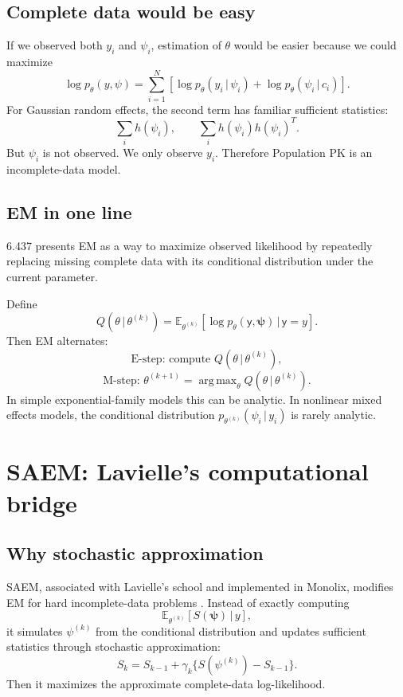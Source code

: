 \documentclass[a4paper]{article}
\DeclareMathOperator*{\argmax}{arg\,max}
\newcommand{\rv}[1]{\mathsf{#1}}
\newcommand{\rpsi}{\boldsymbol{\psi}}
\newcommand{\given}{\,|\,}
\newcommand{\E}{\mathbb{E}}
\begin{document}
\subsection{Complete data would be easy}

If we observed both \(y_i\) and \(\psi_i\), estimation of \(\theta\) would be easier because we could maximize
\[
  \log p_\theta(y,\psi)
  =
  \sum_{i=1}^N
  \left[
    \log p_\theta(y_i\given \psi_i)
    +
    \log p_\theta(\psi_i\given c_i)
  \right].
\]
For Gaussian random effects, the second term has familiar sufficient statistics:
\[
  \sum_i h(\psi_i), \qquad
  \sum_i h(\psi_i)h(\psi_i)^T.
\]
But \(\psi_i\) is not observed. We only observe \(y_i\). Therefore Population PK is an incomplete-data model.

\subsection{EM in one line}

6.437 presents EM as a way to maximize observed likelihood by repeatedly replacing missing complete data with its conditional distribution under the current parameter.

Define
\[
  Q(\theta\given \theta^{(k)})
  =
  \E_{\theta^{(k)}}
  \left[
    \log p_\theta(\rv{y},\rpsi)
    \given \rv{y}=y
  \right].
\]
Then EM alternates:
\[
  \text{E-step: compute } Q(\theta\given\theta^{(k)}),
\]
\[
  \text{M-step: } \theta^{(k+1)}=\argmax_\theta Q(\theta\given\theta^{(k)}).
\]
In simple exponential-family models this can be analytic. In nonlinear mixed effects models, the conditional distribution \(p_{\theta^{(k)}}(\psi_i\given y_i)\) is rarely analytic.

\section{SAEM: Lavielle's computational bridge}

\subsection{Why stochastic approximation}

SAEM, associated with Lavielle's school and implemented in Monolix, modifies EM for hard incomplete-data problems \cite{kuhn2005saem,lavielle2015mixed}. Instead of exactly computing
\[
  \E_{\theta^{(k)}}[S(\rpsi)\given y],
\]
it simulates \(\psi^{(k)}\) from the conditional distribution and updates sufficient statistics through stochastic approximation:
\[
  S_k
  =
  S_{k-1}
  +
  \gamma_k\{S(\psi^{(k)})-S_{k-1}\}.
\]
Then it maximizes the approximate complete-data log-likelihood.
\end{document}
